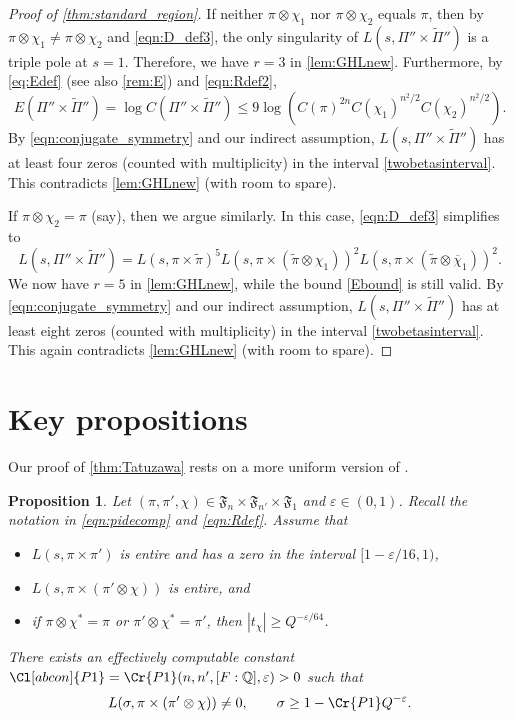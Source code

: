 \documentclass[12pt]{amsart}
\newtheorem{proposition}[theorem]{Proposition}
\theoremstyle{definition}
\theoremstyle{remark}
\numberwithin{equation}{section}
\theoremstyle{plain}
\renewcommand{\tilde}{\widetilde}
\renewcommand{\bar}{\overline}
\renewcommand{\epsilon}{\varepsilon}
\newcommand{\Q}{\mathbb{Q}}
\begin{document}
\begin{proof}[Proof of \cref{thm:standard_region}]
If neither $\pi\otimes\chi_1$ nor $\pi\otimes\chi_2$ equals $\pi$, then by $\pi\otimes\chi_1\neq\pi\otimes\chi_2$ and \eqref{eqn:D_def3}, the only singularity of $L(s,\Pi''\times\tilde{\Pi}'')$ is a triple pole at $s=1$.  Therefore, we have $r=3$ in \cref{lem:GHLnew}.  Furthermore, by \eqref{eq:Edef} (see also \cref{rem:E}) and \eqref{eqn:Rdef2},
\begin{equation}
\label{Ebound}
E(\Pi''\times\tilde{\Pi}'')=\log C(\Pi''\times\tilde{\Pi}'')\leq 9\log(C(\pi)^{2n}C(\chi_1)^{n^2/2}C(\chi_2)^{n^2/2}).
\end{equation}
By \eqref{eqn:conjugate_symmetry} and our indirect assumption, $L(s,\Pi''\times\tilde{\Pi}'')$ has at least four zeros (counted with multiplicity) in the interval \eqref{twobetasinterval}.  This contradicts \cref{lem:GHLnew} (with room to spare).

If $\pi\otimes\chi_2=\pi$ (say), then we argue similarly.  In this case, \eqref{eqn:D_def3} simplifies to
\[
L(s,\Pi''\times\tilde{\Pi}'')=L(s,\pi\times\tilde{\pi})^5 L(s,\pi\times(\tilde{\pi}\otimes\chi_1))^2 L(s,\pi\times(\tilde{\pi}\otimes\bar{\chi}_1))^2.
\]
We now have $r=5$ in \cref{lem:GHLnew}, while the bound \eqref{Ebound} is still valid. By \eqref{eqn:conjugate_symmetry} and our indirect assumption, $L(s,\Pi''\times\tilde{\Pi}'')$ has at least eight zeros (counted with multiplicity) in the interval \eqref{twobetasinterval}. This again contradicts \cref{lem:GHLnew} (with room to spare).
\end{proof}

\section{Key propositions}

Our proof of \cref{thm:Tatuzawa} rests on a more uniform version of \cite[Proposition~4.1]{HarcosThorner}.

\begin{proposition}
\label{prop:P1}
Let $(\pi,\pi',\chi)\in\mathfrak{F}_n\times\mathfrak{F}_{n'}\times\mathfrak{F}_1$ and $\epsilon\in(0,1)$.  Recall the notation in \eqref{eqn:pidecomp} and \eqref{eqn:Rdef}.  Assume that
\begin{itemize}
	\item $L(s,\pi\times\pi')$ is entire and has a zero in the interval $[1-\epsilon/16,1)$,
	\item $L(s,\pi\times(\pi'\otimes\chi))$ is entire, and
	\item if $\pi\otimes\chi^*=\pi$ or $\pi'\otimes\chi^*=\pi'$, then $|t_{\chi}|\geq Q^{-\epsilon/64}$.
\end{itemize}
There exists an effectively computable constant $\Cl[abcon]{P1}=\Cr{P1}(n,n',[F:\Q],\epsilon)>0$ such that
\begin{equation}
\label{ZFR_beta}
L(\sigma,\pi\times(\pi'\otimes\chi))\neq 0,\qquad \sigma\geq 1-\Cr{P1}Q^{-\epsilon}.
\end{equation}
\end{proposition}
\end{document}
